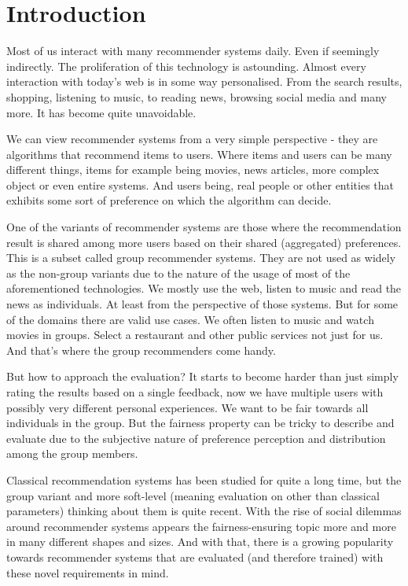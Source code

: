 \chapter{Introduction}  \label{chap_introduction}






Most of us interact with many recommender systems daily. Even if seemingly indirectly. The proliferation of this technology is astounding. Almost every interaction with today's web is in some way personalised. From the search results, shopping, listening to music, to reading news, browsing social media and many more. It has become quite unavoidable.

We can view recommender systems from a very simple perspective - they are algorithms that recommend items to users. Where items and users can be many different things, items for example being movies, news articles, more complex object or even entire systems. And users being, real people or other entities that exhibits some sort of preference on which the algorithm can decide.

One of the variants of recommender systems are those where the recommendation result is shared among more users based on their shared (aggregated) preferences. This is a subset called group recommender systems. They are not used as widely as the non-group variants due to the nature of the usage of most of the aforementioned technologies. We mostly use the web, listen to music and read the news as individuals. At least from the perspective of those systems. But for some of the domains there are valid use cases. We often listen to music and watch movies in groups. Select a restaurant and other public services not just for us. And that's where the group recommenders come handy.

But how to approach the evaluation? It starts to become harder than just simply rating the results based on a single feedback, now we have multiple users with possibly very different personal experiences. We want to be fair towards all individuals in the group. But the fairness property can be tricky to describe and evaluate due to the subjective nature of preference perception and distribution among the group members.

Classical recommendation systems has been studied for quite a long time, but the group variant and more soft-level (meaning evaluation on other than classical parameters) thinking about them is quite recent. With the rise of social dilemmas around recommender systems appears the fairness-ensuring topic more and more in many different shapes and sizes. And with that, there is a growing popularity towards recommender systems that are evaluated (and therefore trained) with these novel requirements in mind.




